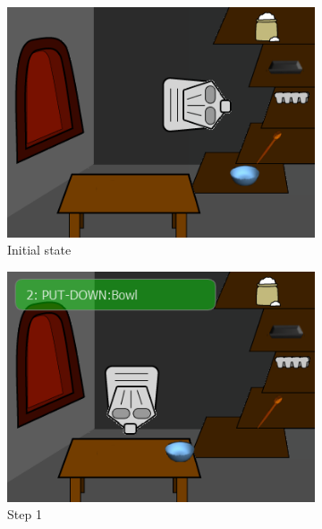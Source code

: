 \begin{figure}[ht]
	\centering
	\begin{subfigure}[b]{0.325\textwidth}
		\centering
		\includegraphics[width=\textwidth]{step0.png}
		\caption{Initial state}
		\label{fig:control_initial}
	\end{subfigure}
	\centering
	\begin{subfigure}[b]{0.325\textwidth}
		\centering
		\includegraphics[width=\textwidth]{step1.png}
		\caption{Step 1}
		\label{fig:control_bowl}
	\end{subfigure}
	\centering
	\begin{subfigure}[b]{0.325\textwidth}
		\centering

\end{subfigure}
\end{figure}

